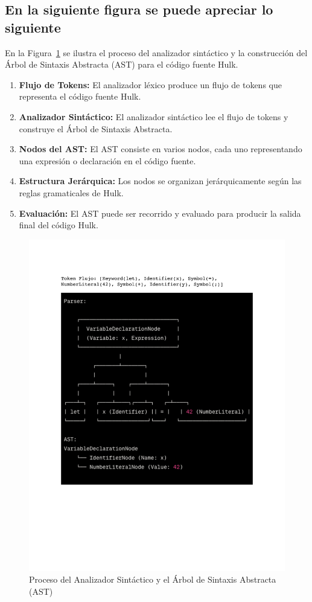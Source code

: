 \documentclass{article}
\begin{document}
\subsection{En la siguiente figura se puede apreciar lo siguiente}

En la Figura~\ref{fig:parser} se ilustra el proceso del analizador sintáctico y la construcción del Árbol de Sintaxis Abstracta (AST) para el código fuente Hulk.

\begin{enumerate}
    \item \textbf{Flujo de Tokens:} El analizador léxico produce un flujo de tokens que representa el código fuente Hulk.

    \item \textbf{Analizador Sintáctico:} El analizador sintáctico lee el flujo de tokens y construye el Árbol de Sintaxis Abstracta.

    \item \textbf{Nodos del AST:} El AST consiste en varios nodos, cada uno representando una expresión o declaración en el código fuente.

    \item \textbf{Estructura Jerárquica:} Los nodos se organizan jerárquicamente según las reglas gramaticales de Hulk.

    \item \textbf{Evaluación:} El AST puede ser recorrido y evaluado para producir la salida final del código Hulk.
\end{enumerate}

\begin{figure}[h]
    \centering
    \includegraphics[width=0.55\linewidth]{images/Parser.pdf}
    \caption{Proceso del Analizador Sintáctico y el Árbol de Sintaxis Abstracta (AST)}
    \label{fig:parser}
\end{figure}
\end{document}
